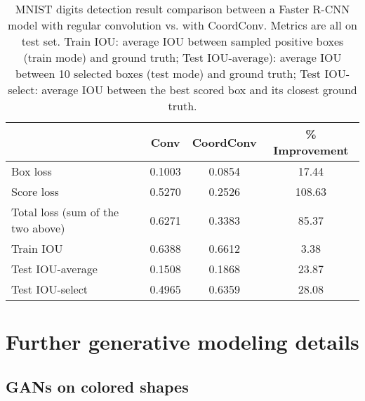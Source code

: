 \documentclass{article}
\begin{document}



\begin{table}[h]
\caption{MNIST digits detection result comparison between a Faster R-CNN model with regular convolution vs. with CoordConv. Metrics are all on test set. Train IOU: average IOU between sampled positive boxes (train mode) and ground truth; Test IOU-average): average IOU between 10 selected boxes (test mode) and ground truth; Test IOU-select: average IOU between the best scored box and its closest ground truth.}

\centering
\begin{tabu} { l| c | c | c}
\toprule
& Conv & CoordConv & \% Improvement \\
\hline
\hline
Box loss & 0.1003 & 0.0854 & 17.44\\
Score loss & 0.5270 &  0.2526  & 108.63\\
Total loss (sum of the two above) & 0.6271 & 0.3383 & 85.37\\
Train IOU & 0.6388 &  0.6612  & 3.38\\
Test IOU-average & 0.1508 &  0.1868  & 23.87\\
Test IOU-select &  0.4965 &  0.6359  & 28.08\\
\hline \hline

\end{tabu}
\label{rpn_numbers}
\end{table}


\begin{comment}
 - , conv, coordconv
val loss: 0.6271, 0.3383
val box loss: 0.1003, 0.0854
val score loss: 0.5270, 0.2526
val box iou train: 0.6388, 0.6612
val box iou nms mean: 0.1508, 0.1868
val box iou nms argmax: 0.4965, 0.6359
\end{comment}





\section{Further generative modeling details}

\subsection{GANs on colored shapes}
\end{document}
